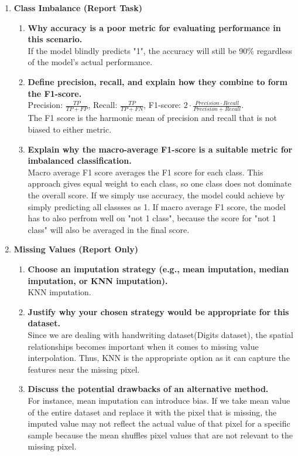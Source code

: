 \documentclass[12pt]{article}
\begin{document}
\begin{enumerate}[label=(\alph*)]
    \item \textbf{Class Imbalance (Report Task)}
        \begin{enumerate}[label=(\arabic*)]
        \item \textbf{Why accuracy is a poor metric for evaluating performance in this scenario.}
        \\ If the model blindly predicts "1", the accuracy will still be 90\% regardless of the model's actual performance.
        \item \textbf{Define precision, recall, and explain how they combine to form the F1-score.}
        \\ Precision: $\frac{TP}{TP + FP}$, Recall: $\frac{TP}{TP + FN}$, F1-score: $2 \cdot \frac{Precision \cdot Recall}{Precision + Recall}$.
        \\ The F1 score is the harmonic mean of precision and recall that is not biased to either metric.
        \item \textbf{Explain why the macro-average F1-score is a suitable metric for imbalanced classification.}
        \\ Macro average F1 score averages the F1 score for each class.
            This approach gives equal weight to each class, so one class does not dominate the overall score.
            If we simply use accuracy, the model could achieve by simply predicting all classses as 1.
            If macro average F1 score, the model has to also perfrom well on "not 1 class", 
            because the score for "not 1 class" will also be averaged in the final score.
    \end{enumerate}
    \vspace{1em} %
    
    \item \textbf{Missing Values (Report Only)}
        \begin{enumerate}[label=(\arabic*)]
        \item \textbf{Choose an imputation strategy (e.g., mean imputation, median imputation, or KNN imputation).}
        \\ KNN imputation.
        \item \textbf{Justify why your chosen strategy would be appropriate for this dataset.}
        \\ Since we are dealing with handwriting dataset(Digits dataset), the spatial relationships becomes important when it comes to missing value interpolation.
            Thus, KNN is the appropriate option as it can capture the features near the missing pixel.
        \item \textbf{Discuss the potential drawbacks of an alternative method.}
        \\ For instance, mean imputation can introduce bias. If we take mean value of the entire dataset and replace it with the pixel that is missing,
            the imputed value may not reflect the actual value of that pixel for a specific sample because the mean shuffles pixel values that are not relevant to the missing pixel.


\end{enumerate}
\end{enumerate}
\end{document}
